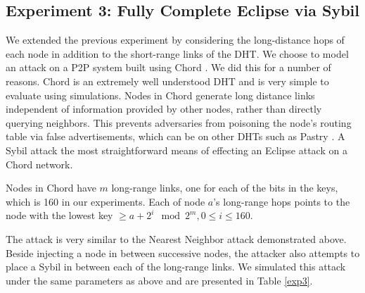 \documentclass[a4paper]{article}
\begin{document}
\subsection{Experiment 3: Fully Complete Eclipse via Sybil}
We extended the previous experiment by considering the long-distance hops of each node in addition to the short-range links of the DHT.
We choose to model an attack on a P2P system built using Chord \cite{chord}.
We did this for a number of reasons.
Chord is an extremely well understood DHT and is very simple to evaluate using simulations.
Nodes in Chord generate long distance links independent of information provided by other nodes, rather than directly querying neighbors.
This prevents adversaries from poisoning the node's routing table via false advertisements, which can be on other DHTs such as Pastry \cite{pastry}. 
A Sybil attack the most straightforward means of effecting an Eclipse attack on a Chord network.

Nodes in Chord have $m$ long-range links, one for each of the bits in the keys, which is 160 in our experiments.
Each of node $a$'s long-range hops points to the node with the lowest key $\geq a + 2^{i} \mod 2^{m} , 0 \leq i \leq 160$.


The attack is very similar to the Nearest Neighbor attack demonstrated above.
Beside injecting a node in between successive nodes, the attacker also attempts to place a Sybil in between each of the long-range links.
We simulated this attack under the same parameters as above and are presented in Table \ref{exp3}.
\end{document}
